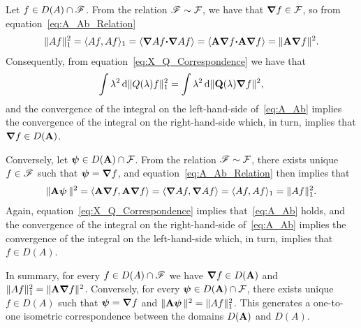 \documentclass[amsa]{ipart}
\begin{document}
Let $f\in D(A)\cap\mathscr{F}$. From the relation
$\mathscr{F}\sim\mathcal{F}$, we have that $\mbox{\boldmath${\nabla}$} f\in\mathcal{F}$, so from
equation~\eqref{eq:A_Ab_Relation}    
%
\begin{align}\label{eq:Norm_A_Ab}
  \|Af\|_1^2=\langle Af,Af\rangle_1
        =\langle\bnabla  A f\bcdot\bnabla  A f\rangle
        =\langle\Ab\bnabla f\bcdot\Ab\bnabla f\rangle
        =\|\Ab\bnabla f\|^2.
\end{align}
%
Consequently, from equation~\eqref{eq:X_Q_Correspondence} we have that
%
\begin{align}\label{eq:A_Ab}
  \int\lambda^2\,\d\|Q(\lambda)f\|_1^2=\int\lambda^2\,\d\|\Qb(\lambda)\bnabla f\|^2,
\end{align}
%
and the convergence of the integral on the left-hand-side
of~\eqref{eq:A_Ab} implies the convergence of the integral on the
right-hand-side which, in turn, implies that $\mbox{\boldmath${\nabla}$} f\in D(\mathbf{A})$.


Conversely, let $\boldsymbol{\psi}\in D(\mathbf{A})\cap\mathcal{F}$. From the
relation $\mathscr{F}\sim\mathcal{F}$, there exists unique $f\in\mathscr{F}$ such that
$\boldsymbol{\psi}=\mbox{\boldmath${\nabla}$} f$, and equation~\eqref{eq:A_Ab_Relation} then
implies that     
%
\begin{align}
  \|\Ab\vecpsi\,\|^2=\langle\Ab\bnabla f,\Ab\bnabla f\rangle
         =\langle\bnabla  A f,\bnabla  A f\rangle
         =\langle Af,Af\rangle_1
         =\|Af\|_1^2.
\end{align}
%
Again, equation~\eqref{eq:X_Q_Correspondence} implies
that~\eqref{eq:A_Ab} holds, and the convergence of the integral on the
right-hand-side of~\eqref{eq:A_Ab} implies the 
convergence of the integral on the left-hand-side which, in turn, implies that
$f\in D(A)$.


In summary, for every $f\in D(A)\cap\mathscr{F}$ we have
$\mbox{\boldmath${\nabla}$} f\in D(\mathbf{A})$ and $\|Af\|_1^2=\|\mathbf{A}\mbox{\boldmath${\nabla}$} f\|^2$. Conversely,
for every $\boldsymbol{\psi}\in D(\mathbf{A})\cap\mathcal{F}$, there exists
unique $f\in D(A)$ such that $\boldsymbol{\psi}=\mbox{\boldmath${\nabla}$} f$ and
$\|\mathbf{A}\boldsymbol{\psi}\,\|^2=\|Af\|_1^2$. This generates a one-to-one isometric
correspondence between the domains $D(\mathbf{A})$ and $D(A)$.      
\end{document}
